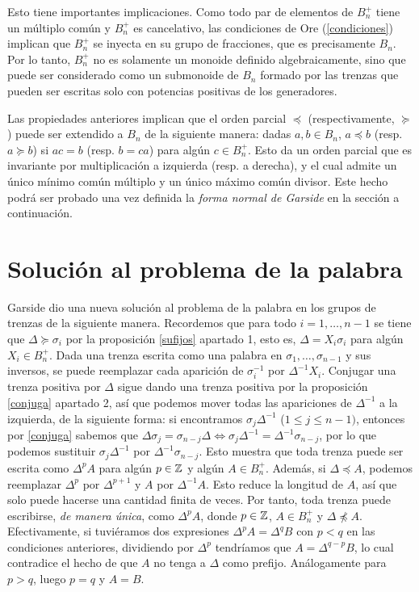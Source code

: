\documentclass[TFG.tex]{subfiles}
\begin{document}

Esto tiene importantes implicaciones. Como todo par de elementos de $B_n^+$ tiene un múltiplo común y $B_n^+$ es cancelativo, las condiciones de Ore (\ref{condiciones}) implican que $B_n^+$ se inyecta en su grupo de fracciones, que es precisamente $B_n$. Por lo tanto, $B_n^+$ no es solamente un monoide definido algebraicamente, sino que puede ser considerado como un submonoide de $B_n$ formado por las trenzas que pueden ser escritas solo con potencias positivas de los generadores. 

Las propiedades anteriores implican que el orden parcial $\preccurlyeq$ (respectivamente, $\succcurlyeq$) puede ser extendido a $B_n$ de la siguiente manera: dadas $a,b\in B_n$, $a\preccurlyeq b$ (resp. $a\succcurlyeq b$) si $ac=b$ (resp. $b=ca$) para algún $c\in B_n^+$. Esto da un orden parcial que es invariante por multiplicación a izquierda (resp. a derecha), y el cual admite un único mínimo común múltiplo y un único máximo común divisor. Este hecho podrá ser probado una vez definida la \emph{forma normal de Garside} en la sección a continuación.

\section{Solución al problema de la palabra}
Garside dio una nueva solución al problema de la palabra en los grupos de trenzas de la siguiente manera. Recordemos que para todo $i=1,\dots, n-1$ se tiene que $\Delta\succcurlyeq\sigma_i$ por la proposición \ref{sufijos} apartado 1, esto es, $\Delta=X_i\sigma_i$ para algún $X_i\in B_n^+$. Dada una trenza escrita como una palabra en $\sigma_1,\dots,\sigma_{n-1}$ y sus inversos, se puede reemplazar cada aparición de $\sigma_i^{-1}$ por $\Delta^{-1}X_i$. Conjugar una trenza positiva por $\Delta$ sigue dando una trenza positiva por la proposición \ref{conjuga} apartado 2, así que podemos mover todas las apariciones de $\Delta^{-1}$ a la izquierda, de la siguiente forma: si encontramos $\sigma_j\Delta^{-1}$ ($1\leq j\leq n-1)$, entonces por \ref{conjuga} sabemos que $\Delta\sigma_{j}=\sigma_{n-j}\Delta\Leftrightarrow  \sigma_j\Delta^{-1}=\Delta^{-1}\sigma_{n-j}$, por lo que podemos sustituir $\sigma_j\Delta^{-1}$ por $\Delta^{-1}\sigma_{n-j}$. Esto muestra que toda trenza puede ser escrita como $\Delta^p A$ para algún $p\in\mathbb{Z}$ y algún $A\in B_n^+$. Además, si $\Delta\preccurlyeq A$, podemos reemplazar $\Delta^p$ por $\Delta^{p+1}$ y $A$ por $\Delta^{-1}A$. Esto reduce la longitud de $A$, así que solo puede hacerse una cantidad finita de veces. Por tanto, toda trenza puede escribirse, \emph{de manera única}, como $\Delta^pA$, donde $p\in\mathbb{Z}$, $A\in B_n^+$ y $\Delta\not\preccurlyeq A$. Efectivamente, si tuviéramos dos expresiones $\Delta^pA=\Delta^q B$ con $p<q$ en las condiciones anteriores, dividiendo por $\Delta^p$ tendríamos que $A=\Delta^{q-p}B$, lo cual contradice el hecho de que $A$ no tenga a $\Delta$ como prefijo. Análogamente para $p>q$, luego $p=q$ y $A=B$.
\end{document}
